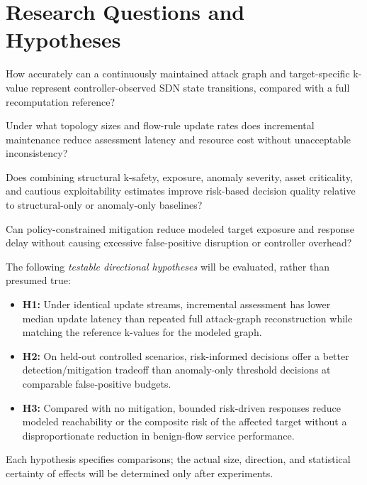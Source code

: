\documentclass[12pt,a4paper,oneside]{article}
\begin{document}
\section{Research Questions and Hypotheses}\label{sec:rq}
\begin{description}[style=nextline,leftmargin=1.65em,labelwidth=1.2em,itemsep=4pt]
\item[\textbf{RQ1.}] How accurately can a continuously maintained attack graph and target-specific k-value represent controller-observed SDN state transitions, compared with a full recomputation reference?
\item[\textbf{RQ2.}] Under what topology sizes and flow-rule update rates does incremental maintenance reduce assessment latency and resource cost without unacceptable inconsistency?
\item[\textbf{RQ3.}] Does combining structural k-safety, exposure, anomaly severity, asset criticality, and cautious exploitability estimates improve risk-based decision quality relative to structural-only or anomaly-only baselines?
\item[\textbf{RQ4.}] Can policy-constrained mitigation reduce modeled target exposure and response delay without causing excessive false-positive disruption or controller overhead?
\end{description}

The following \emph{testable directional hypotheses} will be evaluated, rather than presumed true:
\begin{itemize}
\item \textbf{H1:} Under identical update streams, incremental assessment has lower median update latency than repeated full attack-graph reconstruction while matching the reference k-values for the modeled graph.
\item \textbf{H2:} On held-out controlled scenarios, risk-informed decisions offer a better detection/mitigation tradeoff than anomaly-only threshold decisions at comparable false-positive budgets.
\item \textbf{H3:} Compared with no mitigation, bounded risk-driven responses reduce modeled reachability or the composite risk of the affected target without a disproportionate reduction in benign-flow service performance.
\end{itemize}
Each hypothesis specifies comparisons; the actual size, direction, and statistical certainty of effects will be determined only after experiments.
\end{document}
